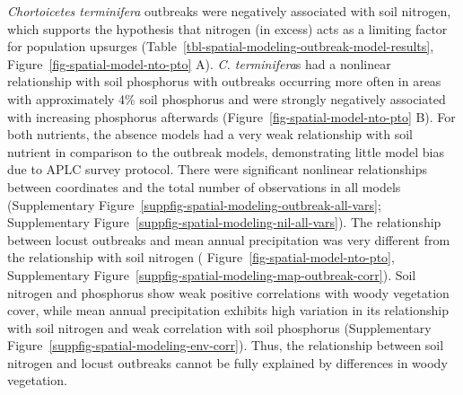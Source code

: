 \documentclass[
]{article}
\begin{document}
\emph{Chortoicetes terminifera} outbreaks were negatively associated
with soil nitrogen, which supports the hypothesis that nitrogen (in
excess) acts as a limiting factor for population upsurges
(Table~\ref{tbl-spatial-modeling-outbreak-model-results},
Figure~\ref{fig-spatial-model-nto-pto} A). \emph{C. terminifera}s had a
nonlinear relationship with soil phosphorus with outbreaks occurring
more often in areas with approximately 4\% soil phosphorus and were
strongly negatively associated with increasing phosphorus afterwards
(Figure~\ref{fig-spatial-model-nto-pto} B). For both nutrients, the
absence models had a very weak relationship with soil nutrient in
comparison to the outbreak models, demonstrating little model bias due
to APLC survey protocol. There were significant nonlinear relationships
between coordinates and the total number of observations in all models
(Supplementary Figure~\ref{suppfig-spatial-modeling-outbreak-all-vars};
Supplementary Figure~\ref{suppfig-spatial-modeling-nil-all-vars}). The
relationship between locust outbreaks and mean annual precipitation was
very different from the relationship with soil nitrogen (
Figure~\ref{fig-spatial-model-nto-pto},
Supplementary Figure~\ref{suppfig-spatial-modeling-map-outbreak-corr}).
Soil nitrogen and phosphorus show weak positive correlations with woody
vegetation cover, while mean annual precipitation exhibits high
variation in its relationship with soil nitrogen and weak correlation
with soil phosphorus
(Supplementary Figure~\ref{suppfig-spatial-modeling-env-corr}). Thus,
the relationship between soil nitrogen and locust outbreaks cannot be
fully explained by differences in woody vegetation.
\end{document}
